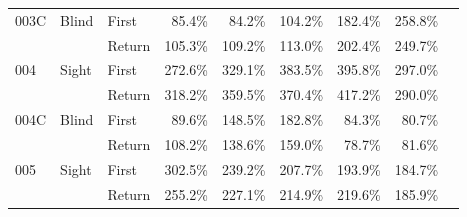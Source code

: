 \begin{table}[!htb]
\begin{tabular}{lllrrrrrr}
003C & Blind & First &   85.4\% &   84.2\% &                                               104.2\% &                                                182.4\% &   258.8\% \\
    &       & Return &  105.3\% &  109.2\% &                                               113.0\% &                                                202.4\% &   249.7\% \\
004 & Sight & First &  272.6\% &  329.1\% &                                               383.5\% &                                                395.8\% &   297.0\% \\
    &       & Return &  318.2\% &  359.5\% &                                               370.4\% &                                                417.2\% &   290.0\% \\
004C & Blind & First &   89.6\% &  148.5\% &                                               182.8\% &                                                 84.3\% &    80.7\% \\
    &       & Return &  108.2\% &  138.6\% &                                               159.0\% &                                                 78.7\% &    81.6\% \\
005 & Sight & First &  302.5\% &  239.2\% &                                               207.7\% &                                                193.9\% &   184.7\% \\
    &       & Return &  255.2\% &  227.1\% &                                               214.9\% &                                                219.6\% &   185.9\% \\
\bottomrule
\end{tabular}
\end{table}

